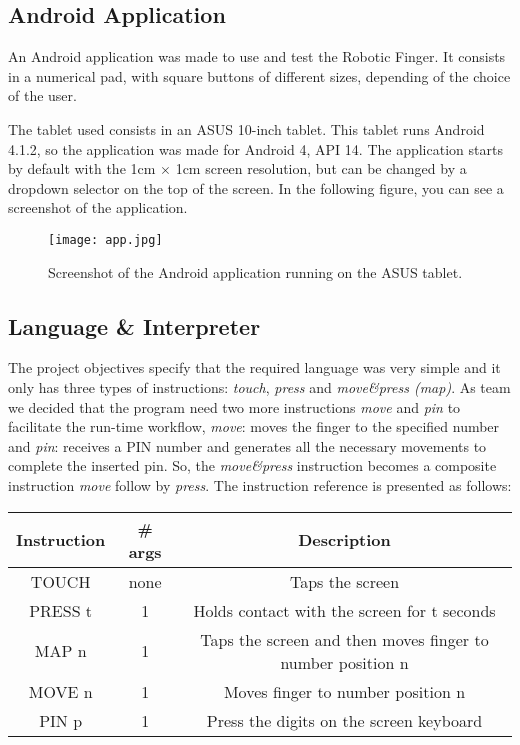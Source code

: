 \documentclass[12pt]{article}
\begin{document}
\subsection{Android Application}
An Android application was made to use and test the Robotic Finger. It consists in a numerical pad, with square buttons of different sizes, depending of the choice of the user.

The tablet used consists in an ASUS 10-inch tablet. This tablet runs Android 4.1.2, so the application was made for Android 4, API 14. The application starts by default with the 1cm $\times$ 1cm screen resolution, but can be changed by a dropdown selector on the top of the screen. In the following figure, you can see a screenshot of the application.

\begin{figure}[H]
\centering
\texttt{[image: app.jpg]}
\caption{Screenshot of the Android application running on the ASUS tablet.}
\end{figure}

\subsection{Language \& Interpreter}

The project objectives specify that the required language was very simple and it only has three types of instructions: \textit{touch}, \textit{press} and \textit{move\&press (map)}. As team we decided that the program need two more instructions \textit{move} and \textit{pin} to facilitate the run-time workflow, \textit{move}: moves the finger to the specified number and \textit{pin}: receives a PIN number and generates all the necessary movements to complete the inserted pin. So, the \textit{move\&press} instruction becomes a composite instruction \textit{move} follow by \textit{press}. The instruction reference is presented as follows:
\begin{center}
  \begin{tabular}{|c|c|c|}
	\hline
    Instruction & \# args & Description  \\
    \hline
    \hline
    TOUCH & none & Taps the screen \\
    \hline
    PRESS t & 1 & Holds contact with the screen for t seconds \\
    \hline
    MAP n & 1 & Taps the screen and then moves finger to number position n\\
    \hline
    MOVE n & 1 & Moves finger to number position n \\
    \hline
    PIN p & 1 & Press the digits on the screen keyboard\\
    \hline
  \end{tabular}
\end{center}
\end{document}

